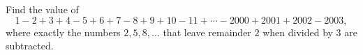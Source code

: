 Find the value of
\[1-2+3+4-5+6+7-8+9+10-11+\cdots-2000+2001+2002-2003,\]
where exactly the numbers $2,5,8,\dots$ that leave remainder $2$ when divided by $3$ are subtracted.
